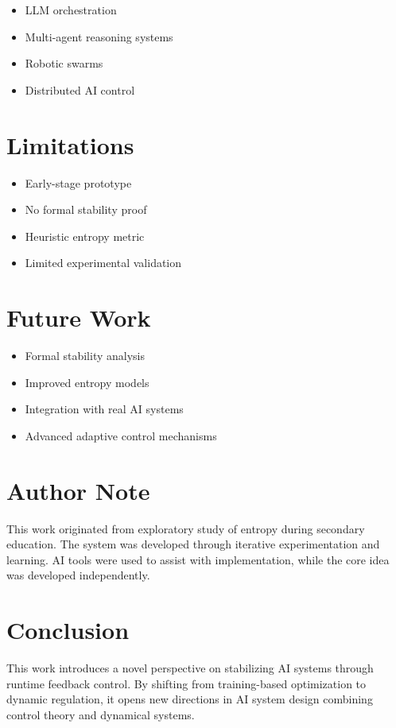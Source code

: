 \documentclass[11pt]{article}
\begin{document}
\begin{itemize}
\item LLM orchestration
\item Multi-agent reasoning systems
\item Robotic swarms
\item Distributed AI control
\end{itemize}

\section{Limitations}

\begin{itemize}
\item Early-stage prototype
\item No formal stability proof
\item Heuristic entropy metric
\item Limited experimental validation
\end{itemize}

\section{Future Work}

\begin{itemize}
\item Formal stability analysis
\item Improved entropy models
\item Integration with real AI systems
\item Advanced adaptive control mechanisms
\end{itemize}

\section{Author Note}

This work originated from exploratory study of entropy during secondary education. The system was developed through iterative experimentation and learning. AI tools were used to assist with implementation, while the core idea was developed independently.

\section{Conclusion}

This work introduces a novel perspective on stabilizing AI systems through runtime feedback control. By shifting from training-based optimization to dynamic regulation, it opens new directions in AI system design combining control theory and dynamical systems.
\end{document}
